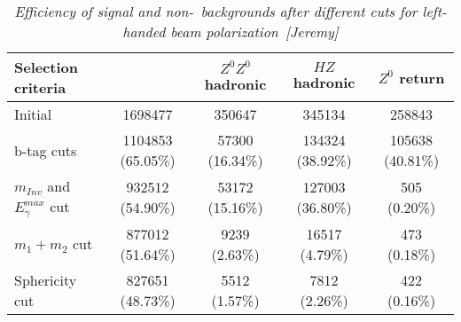         \begin{table}[H]
        \begin{center}
        \begin{tabular}{l c c c c}
        \hline
	Selection criteria & \bbbar & $Z^0Z^0$ hadronic  & $HZ$ hadronic &  $Z^0$ return   \\
	\hline
	Initial & 1698477 & 350647 & 345134 & 258843 \\
	b-tag cuts & 1104853 (65.05\%) & 57300 (16.34\%) & 134324 (38.92\%) & 105638 (40.81\%) \\
	$m_{Inv}$ and $E_\gamma^{max}$ cut & 932512 (54.90\%) & 53172 (15.16\%) & 127003 (36.80\%) &  505 (0.20\%) \\
	$m_1+m_2$ cut & 877012 (51.64\%) & 9239 (2.63\%) & 16517 (4.79\%) & 473 (0.18\%) \\
	Sphericity cut & 827651 (48.73\%) & 5512 (1.57\%) & 7812 (2.26\%) & 422 (0.16\%) \\
        \hline
        \end{tabular}
        \end{center}
        \caption{\sl Efficiency of signal and non-\bbbar\ backgrounds after different cuts for left-handed beam polarization~[Jeremy]}
        \label{table:ttbarselection}
        \end{table}
